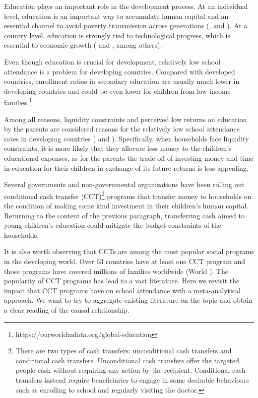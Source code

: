 \documentclass[a4paper, 10pt]{article}
\begin{document}
Education plays an important role in the development process. At an individual level, education is an important way to accumulate human capital and an essential channel to avoid poverty transmission across generations (\cite{angrist1991does}, \cite{duflo2004medium} and \cite{tilak2002education}). At a country level, education is strongly tied to technological progress, which is essential to economic growth (\cite{barro2001human} and \cite{krueger2001education}, among others).

Even though education is crucial for development, relatively low school attendance is a problem for developing countries. Compared with developed countries, enrollment ratios in secondary education are usually much lower in developing countries and could be even lower for children from low income families.\footnote{https://ourworldindata.org/global-education} %

Among all reasons, liquidity constraints and perceived low returns on education by the parents are considered reasons for the relatively low school attendance rates in developing countries (\cite{baland2000child} and \cite{doi:10.1146/annurev.economics.050708.143323}). Specifically, when households face liquidity constraints, it is more likely that they allocate less money to the children’s educational expenses, as for the parents the trade-off of investing money and time in education for their children in exchange of its future returns is less appealing.

Several governments and non-governmental organizations have been rolling out conditional cash transfer (CCT)\footnote{There are two types of cash transfers: unconditional cash transfers and conditional cash transfers. Unconditional cash transfers offer the targeted people cash without requiring any action by the recipient. Conditional cash transfers instead require beneficiaries to engage in some desirable behaviours such as enrolling to school and regularly visiting the doctor.} programs that transfer money to households on the condition of making some kind investment in their children's human capital. Returning to the content of the previous paragraph, transferring cash aimed to young children’s education could mitigate the budget constraints of the households.

It is also worth observing that CCTs are among the most popular social programs in the developing world. Over 63 countries have at least one CCT program and those programs have covered millions of families worldwide (World  \cite{bank2018state}). The popularity of CCT programs has lead to a vast literature. Here we revisit the impact that CCT programs have on school attendance with a meta-analytical approach. We want to try to aggregate existing literature on the topic and obtain a clear reading of the causal relationship.
\end{document}

